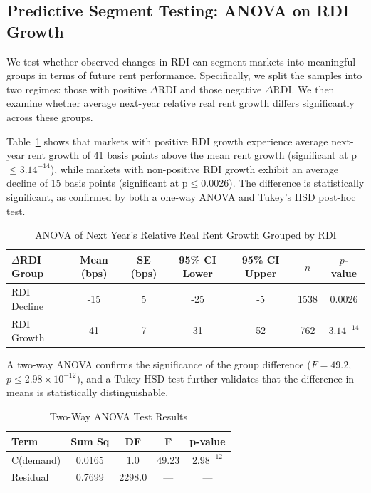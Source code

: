 \documentclass[APA,Times1COL]{WileyNJDv5} %
\begin{document}
\subsection{Predictive Segment Testing: ANOVA on RDI Growth}
We test whether observed changes in RDI can segment markets into meaningful groups in terms of future rent performance. Specifically, we split the samples into two regimes: those with positive $\Delta$RDI and those negative $\Delta$RDI. We then examine whether average next-year relative real rent growth differs significantly across these groups.

Table~\ref{tab:anova-results} shows that markets with positive RDI growth experience average next-year rent growth of 41 basis points above the mean rent growth (significant at p$\leq 3.14^{-14}$), while markets with non-positive RDI growth exhibit an average decline of 15 basis points (significant at p$\leq$0.0026). The difference is statistically significant, as confirmed by both a one-way ANOVA and Tukey’s HSD post-hoc test.

\begin{table}[h]
	\centering
	\caption{ANOVA of Next Year's Relative Real Rent Growth Grouped by RDI}
	\label{tab:anova-results}
	\begin{tabular}{lcccccc} \toprule
		$\Delta$RDI Group & Mean (bps) & SE (bps) & 95\% CI Lower & 95\% CI Upper & $n$ & $p$-value \\ \midrule
		RDI Decline & -15 & 5 & -25 & -5 & 1538 & 0.0026 \\
		RDI Growth & 41 & 7 & 31 & 52 & 762 & $3.14^{-14}$ \\
		\bottomrule
	\end{tabular}
\end{table}

A two-way ANOVA confirms the significance of the group difference ($F = 49.2$, $p \leq 2.98 \times 10^{-12}$), and a Tukey HSD test further validates that the difference in means is statistically distinguishable.
\begin{table}[h]
	\centering
	\caption{Two-Way ANOVA Test Results}
	\label{tab:two-way-anova}
	\begin{tabular}{lcccc} \toprule
		Term & Sum Sq & DF & F & p-value \\ \midrule
		C(demand) & 0.0165 & 1.0 & 49.23 &  $2.98^{-12}$\\
		Residual & 0.7699 & 2298.0 & --- & --- \\
		\bottomrule
	\end{tabular}
\end{table}
\end{document}
